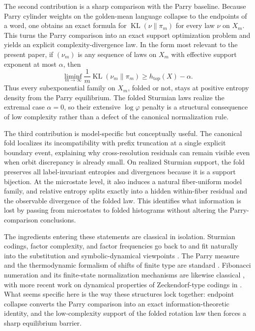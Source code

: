 \documentclass[11pt,letterpaper]{article}
\numberwithin{equation}{section}
\theoremstyle{plain}
\theoremstyle{definition}
\theoremstyle{remark}
\DeclareMathOperator{\KL}{KL}
\begin{document}
The second contribution is a sharp comparison with the Parry baseline. Because
Parry cylinder weights on the golden-mean language collapse to the endpoints of
a word, one obtains an exact formula for \(\KL(\nu\|\pi_m)\) for every law
\(\nu\) on \(X_m\). This turns the Parry comparison into an exact support
optimization problem and yields an explicit complexity-divergence law. In the
form most relevant to the present paper, if \((\nu_m)\) is any sequence of laws
on \(X_m\) with effective support exponent at most \(\alpha\), then
\[
\liminf_{m\to\infty}\frac{1}{m}\KL(\nu_m\|\pi_m)
\ge
h_{\mathrm{top}}(X)-\alpha.
\]
Thus every subexponential family on \(X_m\), folded or not, stays at positive
entropy density from the Parry equilibrium. The folded Sturmian laws realize
the extremal case \(\alpha=0\), so their extensive \(\log\varphi\) penalty is a
structural consequence of low complexity rather than a defect of the canonical
normalization rule.

The third contribution is model-specific but conceptually useful. The canonical
fold localizes its incompatibility with prefix truncation at a single explicit
boundary event, explaining why cross-resolution residuals can remain visible
even when orbit discrepancy is already small. On realized Sturmian support, the
fold preserves all label-invariant entropies and divergences because it is a
support bijection. At the microstate level, it also induces a natural
fiber-uniform model family, and relative entropy splits exactly into a hidden
within-fiber residual and the observable divergence of the folded law. This
identifies what information is lost by passing from microstates to folded
histograms without altering the Parry-comparison conclusions.

The ingredients entering these statements are classical in isolation. Sturmian
codings, factor complexity, and factor frequencies go back to
\cite{MorseHedlund1940,Slater1950DistributionIntegers,Slater1967GapsSteps} and
fit naturally into the substitution and symbolic-dynamical viewpoints
\cite{LindMarcus1995,QueffelecSubstitution,Fogg2002}. The Parry measure and the
thermodynamic formalism of shifts of finite type are standard
\cite{LindMarcus1995,WaltersErgodicTheory,ParryPollicott1990Zeta}. Fibonacci
numeration and its finite-state normalization mechanisms are likewise classical
\cite{Zeckendorf1972,Frougny1991FibonacciFiniteAutomata,Frougny1992NumbersAutomata},
with more recent work on dynamical properties of Zeckendorf-type codings in
\cite{ManiboMiroRustTadeo2020ZeckendorfMixing}. What seems specific here is the
way these structures lock together: endpoint collapse converts the Parry
comparison into an exact information-theoretic identity, and the low-complexity
support of the folded rotation law then forces a sharp equilibrium barrier.
\end{document}
